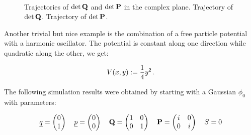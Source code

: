 \begin{figure}
  \centering
   \\
  \caption[Trajectories of the spread matrices]{
    Trajectories of $\det\mathbf{Q}$ and $\det\mathbf{P}$ in the complex plane.
     Trajectory of $\det\mathbf{Q}$.
     Trajectory of $\det\mathbf{P}$.
    \label{fig:ho_traject_QP}
  }
\end{figure}

Another trivial but nice example is the combination of a free particle potential
with a harmonic oscillator. The potential is constant along one direction while
quadratic along the other, we get:

\begin{equation} \label{eq:harmonic_channel}
  V(x,y) := \frac{1}{4} y^2 \,.
\end{equation}

The following simulation results were obtained by starting with a Gaussian $\phi_0$
with parameters:

\begin{align*}
  \underline{q} = \begin{pmatrix}
              0 \\ 1
            \end{pmatrix}
  \quad
  \underline{p} = \begin{pmatrix}
              0 \\ 0
            \end{pmatrix}
  \quad
  \mathbf{Q} = \begin{pmatrix}
              1 & 0 \\ 0 & 1
            \end{pmatrix}
  \quad
  \mathbf{P} = \begin{pmatrix}
              i & 0 \\ 0 & i
            \end{pmatrix}
  \quad
  S = 0
\end{align*}

